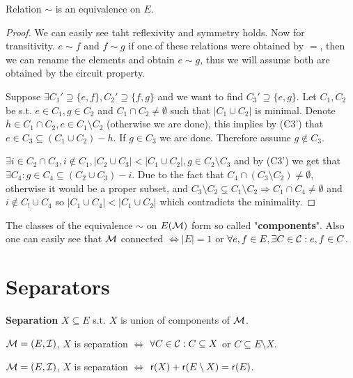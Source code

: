 \begin{prop}
	Relation $\sim$ is an equivalence on $E$.
\end{prop}

\begin{proof}
	We can easily see taht reflexivity and symmetry holds. Now for transitivity. $e \sim f$ and $f \sim g$ if one of these relations were obtained by $=$, then we can rename the elements and obtain $e \sim g$, thus we will assume both are obtained by the circuit property.

	Suppose $\exists C_1' \supseteq \{e,f\}, C_2' \supseteq \{f,g\}$ and we want to find $C_3' \supseteq \{e,g\}$. Let $C_1, C_2$ be s.t. $e \in C_1, g \in C_2$ and $C_1 \cap C_2 \neq \emptyset$ such that $|C_1 \cup C_2|$ is minimal. Denote $h \in C_1 \cap C_2, e \in C_1 \setminus C_2$ (otherwise we are done), this implies by (C3') that $e \in C_3 \subseteq (C_1 \cup C_2) - h$. If $g \in C_3$ we are done. Therefore assume $g \notin C_3$.

	$\exists i \in C_2 \cap C_3, i \notin C_1, |C_2 \cup C_3| < |C_1 \cup C_2|, g \in C_2 \setminus C_3$ and by (C3') we get that $\exists C_4 : g \in C_4 \subseteq (C_2 \cup C_3) - i$. Due to the fact that $C_4 \cap (C_3 \setminus C_2) \neq \emptyset$, otherwise it would be a proper subset, and $C_3 \setminus C_2 \subsetneq C_1 \setminus C_2 \Rightarrow C_1 \cap C_4 \neq \emptyset$ and $i \notin C_! \cup C_4$ so $|C_1 \cup C_4| < |C_1 \cup C_2|$ which contradicts the minimality.
\end{proof}

The classes of the equivalence $\sim$ on $E(\mathcal{M})$ form so called "\textbf{components}". Also one can easily see that $\mathcal{M}$ connected $\iff |E| = 1$ or $\forall e,f \in E, \exists C \in \mathcal{C} : e, f \in C$.

\section{Separators}

\begin{defn}
	\textbf{Separation} $X \subseteq E$ s.t. $X$ is union of components of $\mathcal{M}$.
\end{defn}

\begin{prop}
	$\mathcal{M} = (E, \mathcal{I})$, $X$ is separation $\iff$ $\forall C \in \mathcal{C} : C \subseteq X$ or $C \subseteq E \setminus X$.
\end{prop}

\begin{prop}
	$\mathcal{M} = (E, \mathcal{I})$, $X$ is separation $\iff$ $\operatorname{\mathsf{r}}(X) + \operatorname{\mathsf{r}}(E \setminus X) = \operatorname{\mathsf{r}}(E)$.
\end{prop}

